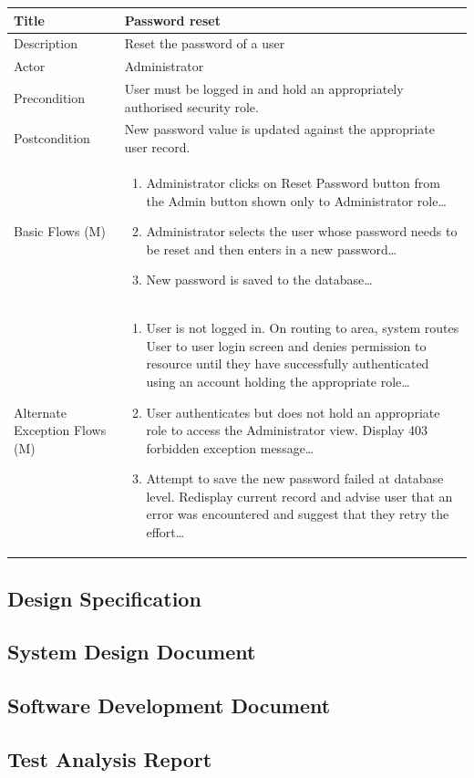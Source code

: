\documentclass[a4paper,12pt]{article}
\newcommand\addrow[2]{#1 &#2\\ }
\newcommand\addheading[2]{#1 &#2\\ \hline}
\newcommand\tabularhead{\begin{tabular}{lp{8cm}}
\hline
}
\newcommand\addmulrow[2]{ \begin{minipage}[t][][t]{2.5cm}#1\end{minipage}%
   &\begin{minipage}[t][][t]{8cm}
    \begin{enumerate} #2   \end{enumerate}
    \end{minipage}\\ }
\newenvironment{usecase}{\tabularhead}
{\hline\end{tabular}}
\begin{document}
\begin{samepage}
\begin{usecase}
   \addheading{Title}{Password reset}
  \addheading{Description}{Reset the password of a user}
  \addheading{Actor}{Administrator} 
  \addrow{Precondition}{User must be logged in and hold an appropriately authorised security role.}
  \addrow{Postcondition}{New password value is updated against the appropriate user record.}
  \addmulrow{Basic Flows (M)}{\item Administrator clicks on Reset Password button from the Admin button shown only to Administrator role\ldots
  \newpage
  \item Administrator selects the user whose password needs to be reset and then enters in a new password\ldots
  \item New password is saved to the database\ldots}
  \addmulrow{Alternate Exception Flows (M)}{\item User is not logged in. On routing to area, system routes User to user login screen and denies permission to resource until they have successfully authenticated using an account holding the appropriate role\ldots
                                                                      \item User authenticates but does not hold an appropriate role to access the Administrator  view. Display 403 forbidden exception message\ldots
                                                                      \item Attempt to save the new password failed at database level. Redisplay current record and advise user that an error was encountered and suggest that they retry the effort\ldots}
\end{usecase}

\end{samepage}
\begin{samepage}
\newpage
\section{Design Specification}
\subsection {System Design Document}
\subsection {Software Development Document}
\subsection {Test Analysis Report}
\end{samepage}
\end{document}
